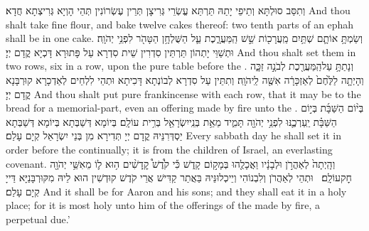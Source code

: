 {וְתִסַּב סוּלְתָּא וְתֵיפֵי יָתַהּ תַּרְתַּא עֱשְׂרֵי גְּרִיצָן תְּרֵין עֶשְׂרוֹנִין תְּהֵי הָוְיָא גְּרִיצְתָא חֲדָא׃}
{And thou shalt take fine flour, and bake twelve cakes thereof: two tenth parts of an ephah shall be in one cake.}{}
{וְשַׂמְתָּ֥ אוֹתָ֛ם שְׁתַּ֥יִם מַֽעֲרָכ֖וֹת שֵׁ֣שׁ הַֽמַּעֲרָ֑כֶת עַ֛ל הַשֻּׁלְחָ֥ן הַטָּהֹ֖ר לִפְנֵ֥י יְהֹוָֽה׃}
{וּתְשַׁוֵּי יָתְהוֹן תַּרְתֵּין סִדְרִין שֵׁית סִדְרָא עַל פָּתוּרָא דָּכְיָא קֳדָם יְיָ׃}
{And thou shalt set them in two rows, six in a row, upon the pure table before the \lord.}{}
{וְנָתַתָּ֥ עַל\maqqaf הַֽמַּעֲרֶ֖כֶת לְבֹנָ֣ה זַכָּ֑ה וְהָיְתָ֤ה לַלֶּ֙חֶם֙ לְאַזְכָּרָ֔ה אִשֶּׁ֖ה לַֽיהֹוָֽה׃}
{וְתִתֵּין עַל סִדְרָא לְבוֹנְתָא דָּכִיתָא וּתְהֵי לִלְחֵים לְאַדְכָרָא קוּרְבָּנָא קֳדָם יְיָ׃}
{And thou shalt put pure frankincense with each row, that it may be to the bread for a memorial-part, even an offering made by fire unto the \lord.}{}
{בְּי֨וֹם הַשַּׁבָּ֜ת בְּי֣וֹם הַשַּׁבָּ֗ת יַֽעַרְכֶ֛נּוּ לִפְנֵ֥י יְהֹוָ֖ה תָּמִ֑יד מֵאֵ֥ת בְּנֵֽי\maqqaf יִשְׂרָאֵ֖ל בְּרִ֥ית עוֹלָֽם׃}
{בְּיוֹמָא דְּשַׁבְּתָא בְּיוֹמָא דְּשַׁבְּתָא יַסְדְּרִנֵּיהּ קֳדָם יְיָ תְּדִירָא מִן בְּנֵי יִשְׂרָאֵל קְיָם עָלַם׃}
{Every sabbath day he shall set it in order before the \lord\space continually; it is from the children of Israel, an everlasting covenant.}{}
{וְהָֽיְתָה֙ לְאַהֲרֹ֣ן וּלְבָנָ֔יו וַאֲכָלֻ֖הוּ בְּמָק֣וֹם קָדֹ֑שׁ כִּ֡י קֹ֩דֶשׁ֩ קׇֽדָשִׁ֨ים ה֥וּא ל֛וֹ מֵאִשֵּׁ֥י יְהֹוָ֖ה חׇק\maqqaf עוֹלָֽם׃ \setuma }
{וּתְהֵי לְאַהֲרֹן וְלִבְנוֹהִי וְיֵיכְלוּנֵּיהּ בַּאֲתַר קַדִּישׁ אֲרֵי קֹדֶשׁ קוּדְשִׁין הוּא לֵיהּ מִקּוּרְבָּנַיָּא דַּייָ קְיָם עָלַם׃}
{And it shall be for Aaron and his sons; and they shall eat it in a holy place; for it is most holy unto him of the offerings of the \lord\space made by fire, a perpetual due.’}{}
